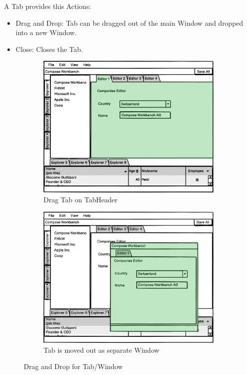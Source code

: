 A Tab provides this Actions:
\begin{itemize}
    \item Drag and Drop: Tab can be dragged out of the main Window and dropped into a new Window.
    \item Close: Closes the Tab.
\end{itemize}

\begin{figure}[H]
\centering
\begin{subfigure}{.5\textwidth}
  \centering
  \includegraphics[width=.9\linewidth]{images/WorkbenchCompose (TabToWindow0) (TabToWindow0).png}
  \caption{Drag Tab on TabHeader}
  \label{fig:ransac_result}
\end{subfigure}%
\begin{subfigure}{.5\textwidth}
  \centering
  \includegraphics[width=.9\linewidth]{images/WorkbenchCompose (TabToWindow) (TabToWindow).png}
  \caption{Tab is moved out as separate Window}
  \label{fig:ransac_rotation}
\end{subfigure}
\caption{Drag and Drop for Tab/Window}
\label{fig:ransac_results}
\end{figure}

